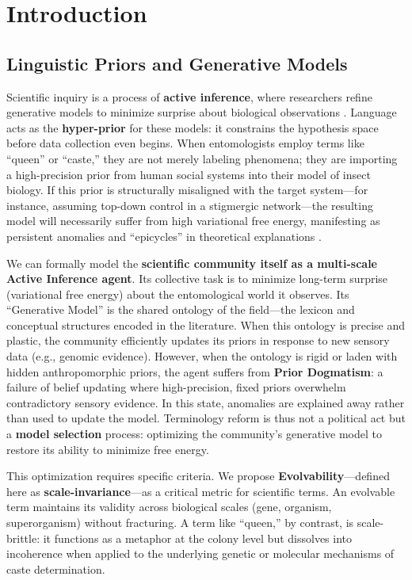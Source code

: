 \documentclass[
]{article}
\numberwithin{equation}{section}
\begin{document}
\newpage

\section{Introduction}\label{sec:introduction}

\subsection{Linguistic Priors and Generative
Models}\label{linguistic-priors-and-generative-models}

Scientific inquiry is a process of \textbf{active inference}, where
researchers refine generative models to minimize surprise about
biological observations \cite{friston2010free}. Language acts as the
\textbf{hyper-prior} for these models: it constrains the hypothesis
space before data collection even begins. When entomologists employ
terms like ``queen'' or ``caste,'' they are not merely labeling
phenomena; they are importing a high-precision prior from human social
systems into their model of insect biology. If this prior is
structurally misaligned with the target system---for instance, assuming
top-down control in a stigmergic network---the resulting model will
necessarily suffer from high variational free energy, manifesting as
persistent anomalies and ``epicycles'' in theoretical explanations
\cite{kuhn1996, clark2013whatever}.

We can formally model the \textbf{scientific community itself as a
multi-scale Active Inference agent}. Its collective task is to minimize
long-term surprise (variational free energy) about the entomological
world it observes. Its ``Generative Model'' is the shared ontology of
the field---the lexicon and conceptual structures encoded in the
literature. When this ontology is precise and plastic, the community
efficiently updates its priors in response to new sensory data (e.g.,
genomic evidence). However, when the ontology is rigid or laden with
hidden anthropomorphic priors, the agent suffers from \textbf{Prior
Dogmatism}: a failure of belief updating where high-precision, fixed
priors overwhelm contradictory sensory evidence. In this state,
anomalies are explained away rather than used to update the model.
Terminology reform is thus not a political act but a \textbf{model
selection} process: optimizing the community's generative model to
restore its ability to minimize free energy.

This optimization requires specific criteria. We propose
\textbf{Evolvability}---defined here as \textbf{scale-invariance}---as a
critical metric for scientific terms. An evolvable term maintains its
validity across biological scales (gene, organism, superorganism)
without fracturing. A term like ``queen,'' by contrast, is
scale-brittle: it functions as a metaphor at the colony level but
dissolves into incoherence when applied to the underlying genetic or
molecular mechanisms of caste determination.
\end{document}
